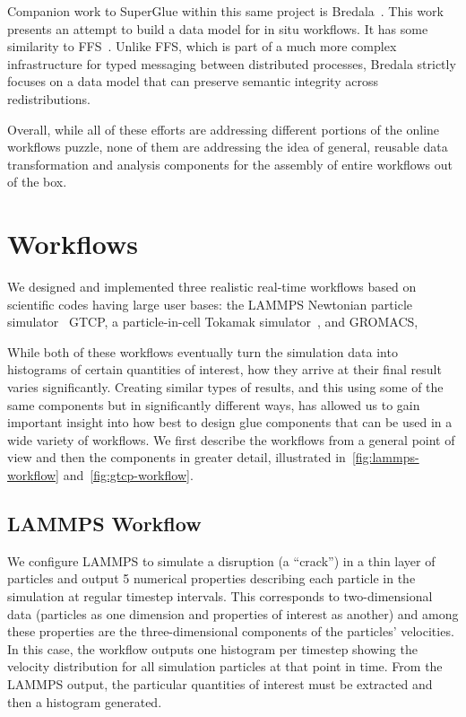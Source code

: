 \documentclass[conference]{IEEEtran}
\begin{document}
Companion work to SuperGlue within this same project is
Bredala~\cite{dreher:2016:bredala}. This work presents an attempt to build a
data model for in situ workflows. It has some similarity to
FFS~\cite{eisenhauer:2011:ffs}. Unlike FFS, which is part of a much more
complex infrastructure for typed messaging between distributed processes,
Bredala strictly focuses on a data model that can preserve
semantic integrity across redistributions.

Overall, while all of these efforts are addressing different portions of the
online workflows puzzle, none of them are addressing the idea of general,
reusable data transformation and analysis components for the assembly
of entire workflows out of the box.

\section{Workflows}
\label{s:workflow}

We designed and implemented three realistic real-time workflows based on
scientific codes having large user bases: the LAMMPS Newtonian particle
simulator~\cite{plimpton:1997:lammps} GTCP, a particle-in-cell Tokamak
simulator~\cite{lin:gtc}, and GROMACS,

While both of these workflows eventually turn the
simulation data into histograms of certain quantities of interest, how they
arrive at their final result varies significantly. Creating similar types of
results, and this using some of the same components but in significantly
different ways, has allowed us to gain important insight into how best to
design glue components that can be used in a wide variety of workflows.
We first describe the workflows from a general point of view
and then the components in greater detail, illustrated
in~\autoref{fig:lammps-workflow} and~\autoref{fig:gtcp-workflow}.

\subsection{LAMMPS Workflow}

We configure LAMMPS to simulate a disruption (a ``crack'') in a thin layer of
particles and output 5 numerical properties describing each particle in the
simulation at regular timestep intervals. This corresponds to two-dimensional
data (particles as one dimension and properties of interest as another) and
among these properties are the three-dimensional components of the particles'
velocities. In this case, the workflow outputs one histogram per timestep
showing the velocity distribution for all simulation particles at that point in
time.  From the LAMMPS output, the particular quantities of interest must be
extracted and then a histogram generated.
\end{document}
